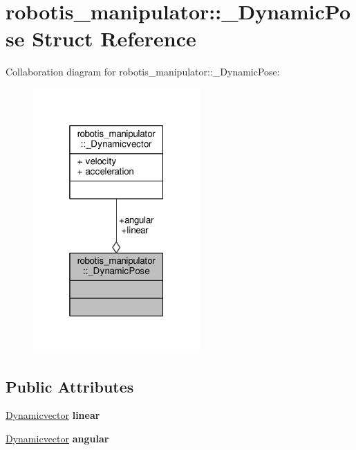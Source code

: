 \hypertarget{structrobotis__manipulator_1_1___dynamic_pose}{}\section{robotis\+\_\+manipulator\+:\+:\+\_\+\+Dynamic\+Pose Struct Reference}
\label{structrobotis__manipulator_1_1___dynamic_pose}


Collaboration diagram for robotis\+\_\+manipulator\+:\+:\+\_\+\+Dynamic\+Pose\+:
\nopagebreak
\begin{figure}[H]
\begin{center}
\leavevmode
\includegraphics[width=181pt]{structrobotis__manipulator_1_1___dynamic_pose__coll__graph}
\end{center}
\end{figure}
\subsection*{Public Attributes}
\begin{DoxyCompactItemize}
\item 
\hyperlink{structrobotis__manipulator_1_1___dynamicvector}{Dynamicvector} {\bfseries linear}\hypertarget{structrobotis__manipulator_1_1___dynamic_pose_aa650aea5d3f468b7827c0ab95595a10d}{}\label{structrobotis__manipulator_1_1___dynamic_pose_aa650aea5d3f468b7827c0ab95595a10d}

\item 
\hyperlink{structrobotis__manipulator_1_1___dynamicvector}{Dynamicvector} {\bfseries angular}\hypertarget{structrobotis__manipulator_1_1___dynamic_pose_ac70aa155aa525ea8ba1674be78c67203}{}\label{structrobotis__manipulator_1_1___dynamic_pose_ac70aa155aa525ea8ba1674be78c67203}

\end{DoxyCompactItemize}


